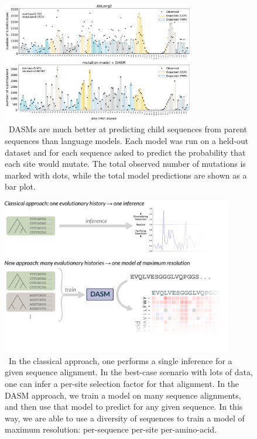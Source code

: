 \documentclass{article}
\begin{document}
\begin{figure}[ht]
\centering
\centerline{\includegraphics[width=0.75\textwidth]{figures/sites-oe-rodriguez}}
\caption{\
DASMs are much better at predicting child sequences from parent sequences than language models.
Each model was run on a held-out dataset and for each sequence asked to predict the probability that each site would mutate.
The total observed number of mutations is marked with dots, while the total model predictions are shown as a bar plot.
}%
\label{fig:selFactorsAndPerplexity}
\end{figure}


\begin{figure}[h!]
\centering
\centerline{\includegraphics[width=0.9\textwidth]{figures/dasm-paradigm}}
\caption{\
In the classical approach, one performs a single inference for a given sequence alignment. 
In the best-case scenario with lots of data, one can infer a per-site selection factor for that alignment.
In the DASM approach, we train a model on many sequence alignments, and then use that model to predict for any given sequence.
In this way, we are able to use a diversity of sequences to train a model of maximum resolution: per-sequence per-site per-amino-acid.
}%
\label{fig:methods}
\end{figure}
\end{document}
